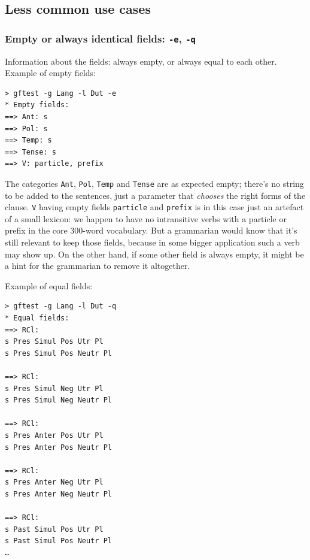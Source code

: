 \hypertarget{less-common-use-cases}{%
\subsection{Less common use cases}\label{less-common-use-cases}}

\hypertarget{empty-or-always-identical-fields--e--q}{%
\subsubsection{\texorpdfstring{Empty or always identical fields:
\texttt{-e},
\texttt{-q}}{Empty or always identical fields: -e, -q}}\label{empty-or-always-identical-fields--e--q}}

Information about the fields: always empty, or always equal to each
other. Example of empty fields:

\begin{verbatim}
> gftest -g Lang -l Dut -e
* Empty fields:
==> Ant: s
==> Pol: s
==> Temp: s
==> Tense: s
==> V: particle, prefix
\end{verbatim}

The categories \texttt{Ant}, \texttt{Pol}, \texttt{Temp} and
\texttt{Tense} are as expected empty; there's no string to be added to
the sentences, just a parameter that \emph{chooses} the right forms of
the clause.
\texttt{V} having empty fields \texttt{particle} and \texttt{prefix} is
in this case just an artefact of a small lexicon: we happen to have no
intransitive verbs with a particle or prefix in the core 300-word
vocabulary. But a grammarian would know that it's still relevant to keep
those fields, because in some bigger application such a verb may show
up.
On the other hand, if some other field is always empty, it might be a
hint for the grammarian to remove it altogether.

Example of equal fields:

\begin{verbatim}
> gftest -g Lang -l Dut -q
* Equal fields:
==> RCl:
s Pres Simul Pos Utr Pl
s Pres Simul Pos Neutr Pl

==> RCl:
s Pres Simul Neg Utr Pl
s Pres Simul Neg Neutr Pl

==> RCl:
s Pres Anter Pos Utr Pl
s Pres Anter Pos Neutr Pl

==> RCl:
s Pres Anter Neg Utr Pl
s Pres Anter Neg Neutr Pl

==> RCl:
s Past Simul Pos Utr Pl
s Past Simul Pos Neutr Pl
…
\end{verbatim}


